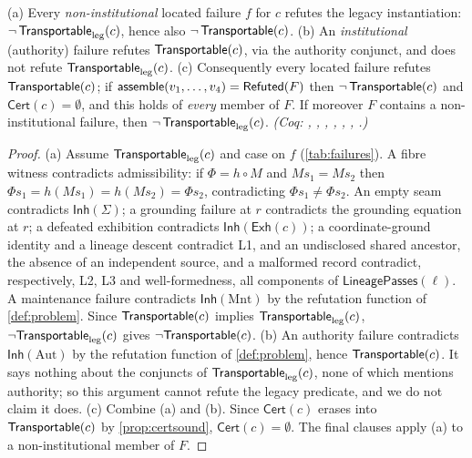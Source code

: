 \begin{prop}\label{prop:refsound}
(a) Every \emph{non-institutional} located failure $f$ for $c$ refutes the legacy instantiation: $\neg\,\mathsf{Transportable}_{\mathrm{leg}}(c)$, hence also $\neg\,\mathsf{Transportable}(c)$.
(b) An \emph{institutional} (authority) failure refutes $\mathsf{Transportable}(c)$, via the authority conjunct, and does not refute $\mathsf{Transportable}_{\mathrm{leg}}(c)$.
(c) Consequently every located failure refutes $\mathsf{Transportable}(c)$; if $\mathsf{assemble}(v_1,\dots,v_4) = \mathsf{Refuted}(F)$ then $\neg\,\mathsf{Transportable}(c)$ and $\mathsf{Cert}(c) = \emptyset$, and this holds of \emph{every} member of $F$. If moreover $F$ contains a non-institutional failure, then $\neg\,\mathsf{Transportable}_{\mathrm{leg}}(c)$.
\emph{(Coq: , , , , , , .)}
\end{prop}
\begin{proof}
(a) Assume $\mathsf{Transportable}_{\mathrm{leg}}(c)$ and case on $f$ (\cref{tab:failures}). A fibre witness contradicts admissibility: if $\Phi = h \circ M$ and $M s_1 = M s_2$ then $\Phi s_1 = h(M s_1) = h(M s_2) = \Phi s_2$, contradicting $\Phi s_1 \neq \Phi s_2$. An empty seam contradicts $\mathsf{Inh}(\Sigma)$; a grounding failure at $r$ contradicts the grounding equation at $r$; a defeated exhibition contradicts $\mathsf{Inh}(\mathsf{Exh}(c))$; a coordinate-ground identity and a lineage descent contradict L1, and an undisclosed shared ancestor, the absence of an independent source, and a malformed record contradict, respectively, L2, L3 and well-formedness, all components of $\mathsf{LineagePasses}(\ell)$. A maintenance failure contradicts $\mathsf{Inh}(\mathrm{Mnt})$ by the refutation function of \cref{def:problem}. Since $\mathsf{Transportable}(c)$ implies $\mathsf{Transportable}_{\mathrm{leg}}(c)$, $\neg\mathsf{Transportable}_{\mathrm{leg}}(c)$ gives $\neg\mathsf{Transportable}(c)$.
(b) An authority failure contradicts $\mathsf{Inh}(\mathrm{Aut})$ by the refutation function of \cref{def:problem}, hence $\mathsf{Transportable}(c)$. It says nothing about the conjuncts of $\mathsf{Transportable}_{\mathrm{leg}}(c)$, none of which mentions authority; so this argument cannot refute the legacy predicate, and we do not claim it does.
(c) Combine (a) and (b). Since $\mathsf{Cert}(c)$ erases into $\mathsf{Transportable}(c)$ by \cref{prop:certsound}, $\mathsf{Cert}(c) = \emptyset$. The final clauses apply (a) to a non-institutional member of $F$.
\end{proof}

